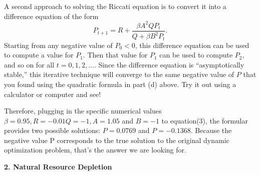 \documentclass[12pt]{article}
\begin{document}
A second approach to solving the Riccati equation is to convert it into a difference equation of the form
\begin{equation}
P_{t+1} = R + \frac{\beta A^{2}QP_{t}}{Q+\beta B^{2} P_{t}}.
\end{equation}
Starting from any negative value of $P_{0}<0$, this difference equation can be used to compute a value for $P_{1}$. Then that value for $P_{1}$ can be used to compute $P_{2}$, and so on for all $t=0,1,2,...$. Since the difference equation is ``asymptotically stable,'' this iterative technique will converge to the same negative value of $P$ that you found using the quadratic formula in part (d) above. Try it out using a calculator or computer and see!

Therefore, plugging in the specific numerical values $\beta = 0.95, R = -0.01Q = -1, A = 1.05$ and $B = -1$ to equation(3), the formular provides two possible solutions: $P = 0.0769$ and $P = -0.1368$. Because the negative value P corresponds to the true solution to the original dynamic optimization problem, that's the answer we are looking for. 

{\bfseries 2. Natural Resource Depletion}
\end{document}
